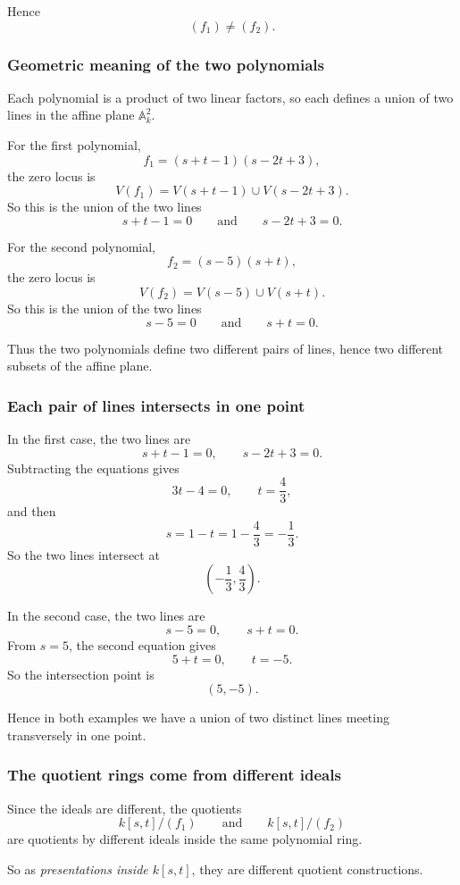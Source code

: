 \documentclass[12pt,a4paper]{article}
\theoremstyle{notespace}
\theoremstyle{definition}
\begin{document}
Hence
\[
(f_1)\neq (f_2).
\]

\subsubsection{Geometric meaning of the two polynomials}

Each polynomial is a product of two linear factors, so each defines a union of two lines in the affine plane \(\mathbb{A}^2_k\).

For the first polynomial,
\[
f_1=(s+t-1)(s-2t+3),
\]
the zero locus is
\[
V(f_1)=V(s+t-1)\cup V(s-2t+3).
\]
So this is the union of the two lines
\[
s+t-1=0
\qquad\text{and}\qquad
s-2t+3=0.
\]

For the second polynomial,
\[
f_2=(s-5)(s+t),
\]
the zero locus is
\[
V(f_2)=V(s-5)\cup V(s+t).
\]
So this is the union of the two lines
\[
s-5=0
\qquad\text{and}\qquad
s+t=0.
\]

Thus the two polynomials define two different pairs of lines, hence two different subsets of the affine plane.

\subsubsection{Each pair of lines intersects in one point}

In the first case, the two lines are
\[
s+t-1=0,
\qquad
s-2t+3=0.
\]
Subtracting the equations gives
\[
3t-4=0,
\qquad
t=\frac{4}{3},
\]
and then
\[
s=1-t=1-\frac{4}{3}=-\frac{1}{3}.
\]
So the two lines intersect at
\[
\left(-\frac13,\frac43\right).
\]

In the second case, the two lines are
\[
s-5=0,
\qquad
s+t=0.
\]
From \(s=5\), the second equation gives
\[
5+t=0,
\qquad
t=-5.
\]
So the intersection point is
\[
(5,-5).
\]

Hence in both examples we have a union of two distinct lines meeting transversely in one point.

\subsubsection{The quotient rings come from different ideals}

Since the ideals are different, the quotients
\[
k[s,t]/(f_1)
\qquad\text{and}\qquad
k[s,t]/(f_2)
\]
are quotients by different ideals inside the same polynomial ring.

So as \emph{presentations inside \(k[s,t]\)}, they are different quotient constructions.
\end{document}
